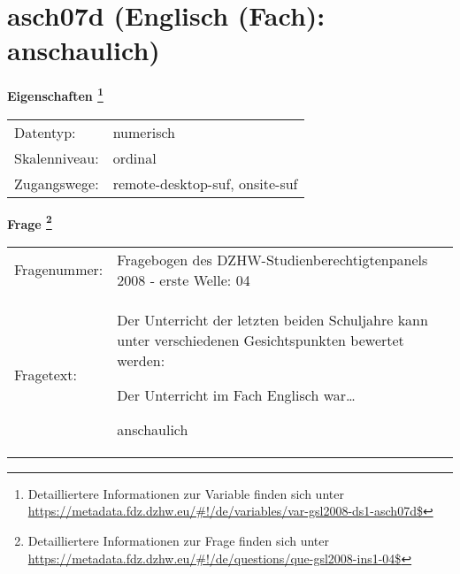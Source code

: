 
    \setcounter{footnote}{0}

    \vspace*{-1.8cm}
	\section{asch07d (Englisch (Fach): anschaulich)}
	\label{section:asch07d}



    \vspace*{0.5cm}
    \noindent\textbf{Eigenschaften
	\footnote{Detailliertere Informationen zur Variable finden sich unter
		\url{https://metadata.fdz.dzhw.eu/\#!/de/variables/var-gsl2008-ds1-asch07d$}}}\\
	\begin{tabularx}{\hsize}{@{}lX}
	Datentyp: & numerisch \\
	Skalenniveau: & ordinal \\
	Zugangswege: &
	  remote-desktop-suf, 
	  onsite-suf
 \\
    \end{tabularx}



				\vspace*{0.5cm}
                \noindent\textbf{Frage
	                \footnote{Detailliertere Informationen zur Frage finden sich unter
		              \url{https://metadata.fdz.dzhw.eu/\#!/de/questions/que-gsl2008-ins1-04$}}}\\
				\begin{tabularx}{\hsize}{@{}lX}
					Fragenummer: &
					  Fragebogen des DZHW-Studienberechtigtenpanels 2008 - erste Welle:
					  04
 \\
					Fragetext: & Der Unterricht der letzten beiden Schuljahre kann unter verschiedenen Gesichtspunkten bewertet werden:\par  Der Unterricht im Fach Englisch war…\par  anschaulich \\
				\end{tabularx}





